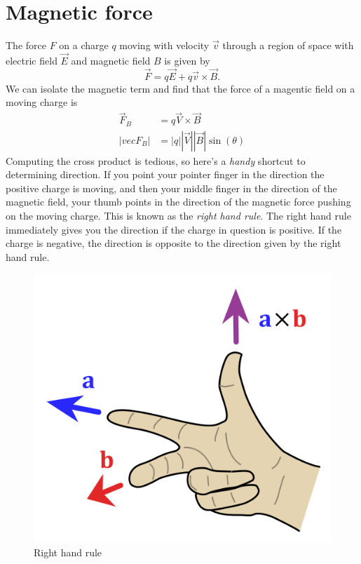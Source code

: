 \documentclass[nobib]{tufte-handout}
\begin{document}
\section{Magnetic force}
The force $F$ on a charge $q$ moving with velocity
$\vec{v}$ through a region of space with electric field $\vec{E}$
and magnetic field $B$ is given by
\[\vec{F} = q\vec{E} + q\vec{v}\times\vec{B}.\]
We can isolate the magnetic term and find that the 
force of a magentic field on a moving charge is 
\begin{align*}
    \vec{F}_B &= q\vec{V} \times \vec{B} \\
    |vec{F}_B| &= |q||\vec{V}||\vec{B}|\sin(\theta)
\end{align*}
Computing the cross product is tedious, so here's a \emph{handy} 
shortcut to determining direction. 
If you point your pointer finger in 
the direction the positive charge is moving, and then your 
middle finger in the direction of the magnetic field, your 
thumb points in the direction of the magnetic force pushing 
on the moving charge. This is known as the \emph{right hand rule}. 
The right hand rule immediately gives you the direction if 
the charge in question is positive. If the charge is negative, the direction 
is opposite to the direction given by the right hand rule.
\begin{figure}
    \center 
    \caption{Right hand rule}
    \label{fig:rhr}
    \includegraphics{images/1200px-Right_hand_rule_cross_product.svg.png}
\end{figure}
\end{document}
